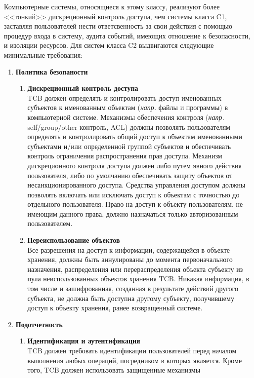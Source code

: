 \begin{enumerate}
\begin{enumerate}
		Компьютерные системы, относящиеся к этому классу, реализуют более <<тонкий>> дискреционный контроль доступа, чем системы класса C1, заставляя пользователей нести ответсвенность за свои
		действия с помощью процедур входа в систему, аудита событий, имеющих отношение к безопасности, и изоляции ресурсов. Для систем класса C2 выдвигаются следующие минимальные требования:
		\begin{enumerate}
			\item{\textbf{Политика безопаности}}
			\begin{enumerate}
				\item{\textbf{Дискреционный контроль доступа}}\\
				TCB должен определять и контролировать доступ именованных субъектов к именованным объектам (\textit{напр.} файлы и программы) в компьютерной системе. Механизмы обеспечения контроля
				(\textit{напр.} self/group/other контроль, ACL) должны позволять пользователям определять и контролировать общий доступ к объектам именованными субъектами и/или определенной группой
				субъектов и обеспечивать контроль ограничения распространения прав доступа. Механизм дискреционного контроля доступа должен либо путем явного действия пользователя, либо по умолчанию
				обеспечивать защиту объектов от несанкционированного доступа. Средства управления доступом должны позволять включать или исключать доступ к объектам с точностью до отдельного
				пользователя. Право на доступ к объекту пользователям, не имеющим данного права, должно назначаться только авторизованным пользователем. 
				\item{\textbf{Переиспользование объектов}}\\
				Все разрешения на доступ к информации, содержащейся в объекте хранения, должны быть аннулированы до момента первоначального назначения, распределения или перераспределения объекта
				субъекту из пула неиспользованных объектов хранения TCB. Никакая информация, в том числе и зашифрованная, созданная в результате действий другого субъекта, не должна быть доступна
				другому субъекту, получившему доступ к объекту хранения, ранее возвращенный системе.  	
			\end{enumerate}
			\item{\textbf{Подотчетность}}
			\begin{enumerate}
				\item{\textbf{Идентификация и аутентификация}}\\
				TCB должен требовать идентификации пользователей перед началом выполнения любых операций, посредником в которых является. Кроме того, TCB должен использовать защищенные механизмы

\end{enumerate}
\end{enumerate}
\end{enumerate}
\end{enumerate}
